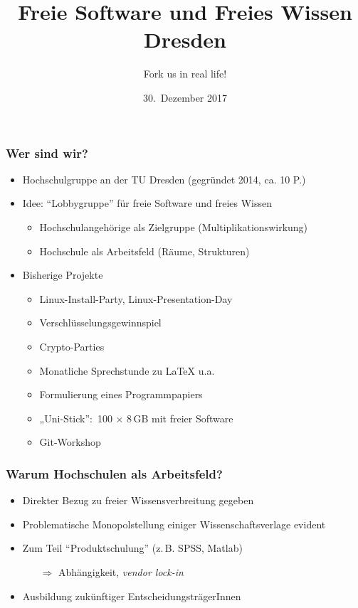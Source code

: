 \documentclass{beamer}
\title{Freie Software und Freies Wissen Dresden}
\subtitle{Fork us in real life!}
\date{30.~Dezember 2017}
\begin{document}
\begin{frame}
  \maketitle
\end{frame}

\begin{frame}
  \frametitle{Wer sind wir?}
  \onslide<+->
  \begin{itemize}
  \item Hochschulgruppe an der TU Dresden (gegründet 2014, ca. 10 P.)
  \item Idee: \enquote{Lobbygruppe} für freie Software und freies Wissen
    \begin{itemize}
    \item Hochschulangehörige als Zielgruppe (Multiplikationswirkung)
    \item Hochschule als Arbeitsfeld (Räume, Strukturen)
    \end{itemize}
    \bigskip\onslide<+->
  \item Bisherige Projekte
    \begin{itemize}
    \item Linux-Install-Party, Linux-Presentation-Day
    \item Verschlüsselungsgewinnspiel
    \item Crypto-Parties
    \item Monatliche Sprechstunde zu \LaTeX{} u.a.
    \item Formulierung eines Programmpapiers
    \item „Uni-Stick”:~100 $\times$ 8\,GB mit freier Software
    \item Git-Workshop
    \end{itemize}
  \end{itemize}
\end{frame}

\begin{frame}
  \frametitle{Warum Hochschulen als Arbeitsfeld?}
  \begin{itemize}
  \item<1-> Direkter Bezug zu freier Wissensverbreitung gegeben
  \item<2-> Problematische Monopolstellung einiger Wissenschaftsverlage
    evident
  \item<3-> Zum Teil \enquote{Produktschulung} (z.\,B. SPSS, Matlab)
    \begin{itemize}
    \item[$\Rightarrow$] Abhängigkeit, \emph{vendor lock-in}
    \end{itemize}
  \item<4-> Ausbildung zukünftiger EntscheidungsträgerInnen
  \end{itemize}
\end{frame}
\end{document}
